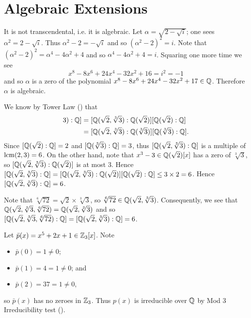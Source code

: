 \section{Algebraic Extensions}
\begin{questions}
    \item It is not transcendental, i.e. it is algebraic. Let $\alpha = \sqrt{2-\sqrt{i}}$; one sees $\alpha^2 = 2 - \sqrt{i}$. Thus $\alpha^2 - 2 = -\sqrt{i}$ and so $(\alpha^2-2)^2 = i$. Note that $(\alpha^2 - 2)^2 = \alpha^4 - 4\alpha^2 + 4$ and so $\alpha^4 - 4\alpha^2 + 4 = i$. Squaring one more time we see
    \[
        x^8 - 8x^6 + 24x^4 - 32x^2 + 16 = i^2 = -1
    \]
    and so $\alpha$ is a zero of the polynomial $x^8 - 8x^6 + 24x^4 - 32x^2 + 17 \in \mathbb{Q}$. Therefore $\alpha$ is algebraic.

    \item \begin{partquestions}{\alph*}
        \item \begin{partquestions}{\roman*}
            \item We know by Tower Law () that
            \begin{align*}
                [\Q(\sqrt2, \sqrt[3]3): \Q] &= [\Q(\sqrt2, \sqrt[3]3): \Q(\sqrt2)][\Q(\sqrt2):\Q]\\
                &= [\Q(\sqrt2, \sqrt[3]3): \Q(\sqrt[3]3)][\Q(\sqrt[3]3):\Q].
            \end{align*}
            Since $[\mathbb{Q}(\sqrt2):\mathbb{Q}] = 2$ and $[\mathbb{Q}(\sqrt[3]3):\mathbb{Q}] = 3$, thus $[\mathbb{Q}(\sqrt2, \sqrt[3]3): \mathbb{Q}]$ is a multiple of $\mathrm{lcm}(2, 3) = 6$. On the other hand, note that $x^3 - 3 \in \mathbb{Q}(\sqrt2)[x]$ has a zero of $\sqrt[3]3$, so $[\mathbb{Q}(\sqrt2, \sqrt[3]3): \mathbb{Q}(\sqrt2)]$ is at most 3. Hence $[\mathbb{Q}(\sqrt2, \sqrt[3]3): \mathbb{Q}] = [\mathbb{Q}(\sqrt2, \sqrt[3]3): \mathbb{Q}(\sqrt2)][\mathbb{Q}(\sqrt2):\mathbb{Q}] \leq 3 \times 2 = 6$. Hence $[\mathbb{Q}(\sqrt2, \sqrt[3]3): \mathbb{Q}] = 6$.

            \item Note that $\sqrt[6]{72} = \sqrt2 \times \sqrt[3]3$, so $\sqrt[6]{72} \in \mathbb{Q}(\sqrt2, \sqrt[3]3)$. Consequently, we see that $\mathbb{Q}(\sqrt2, \sqrt[3]3, \sqrt[6]{72}) = \mathbb{Q}(\sqrt2, \sqrt[3]3)$ and so $[\mathbb{Q}(\sqrt2, \sqrt[3]3, \sqrt[6]{72}):\mathbb{Q}] = [\mathbb{Q}(\sqrt2, \sqrt[3]3): \mathbb{Q}] = 6$.
        \end{partquestions}

        \item \begin{partquestions}{\roman*}
            \item Let $\bar{p}(x) = x^5 + 2x + 1 \in \mathbb{Z}_3[x]$. Note
            \begin{itemize}
                \item $\bar{p}(0) = 1 \neq 0$;
                \item $\bar{p}(1) = 4 = 1 \neq 0$; and
                \item $\bar{p}(2) = 37 = 1 \neq 0$,
            \end{itemize}
            so $\bar{p}(x)$ has no zeroes in $\mathbb{Z}_3$. Thus $p(x)$ is irreducible over $\mathbb{Q}$ by Mod 3 Irreducibility test ().


\end{partquestions}
\end{partquestions}
\end{questions}
